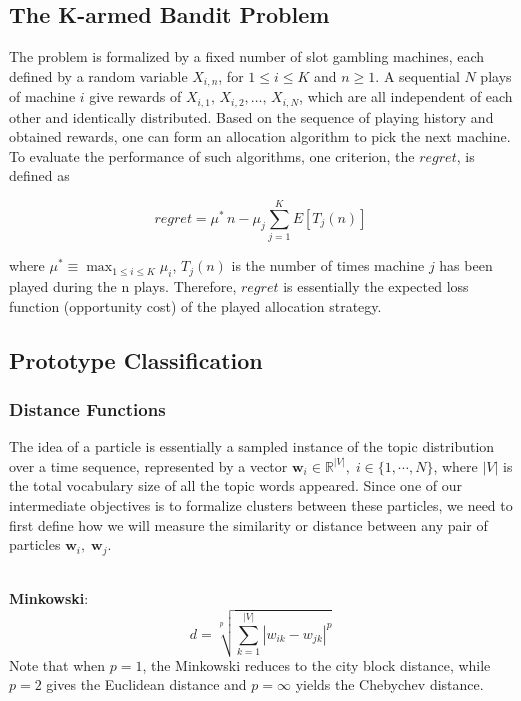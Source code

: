 \documentclass[conference]{IEEEtran}
\begin{document}
\subsection{The K-armed Bandit Problem}
The problem is formalized by a fixed number of slot gambling machines, each defined by a random variable $X_{i,n}$, for $1\leq i \leq K$ and $n \geq 1$. A sequential $N$ plays of machine $i$ give rewards of $X_{i,1},\,X_{i,2},\dots,\, X_{i,N}$, which are all independent of each other and identically distributed. Based on the sequence of playing history and obtained rewards, one can form an allocation algorithm to pick the next machine. To evaluate the performance of such algorithms, one criterion, the $regret$, is defined as

\begin{equation*}
	regret = \mu^{*}\,n - \mu_j \sum_{j=1}^K E[T_j(n)]
\end{equation*}

where $\mu^{*} \equiv \max_{1\leq i \leq K} \mu_i$, $T_j(n)$ is the number of times machine $j$ has been played during the n plays. Therefore, $regret$ is essentially the expected loss function (opportunity cost) of the played allocation strategy.

\subsection{Prototype Classification}


\subsubsection{Distance Functions}
The idea of a particle is essentially a sampled instance of the topic distribution over a time sequence, represented by a vector $\mathbf{w}_i\in \mathbb{R}^{|V|},\; i \in \{1,\cdots,N\}$, where $|V|$ is the total vocabulary size of all the topic words appeared. Since one of our intermediate objectives is to formalize clusters between these particles, we need to first define how we will measure the similarity or distance between any pair of particles $\mathbf{w}_i,\; \mathbf{w}_j$. 

\-\\
\textbf{Minkowski}: 
\begin{equation*}
	d = \sqrt[p]{\sum_{k=1}^{|V|}|w_{ik} - w_{jk}|^p}
\end{equation*}
 Note that when $p=1$, the Minkowski reduces to the city block distance, while $p=2$ gives the Euclidean distance and $p=\infty$ yields the Chebychev distance.
\end{document}
